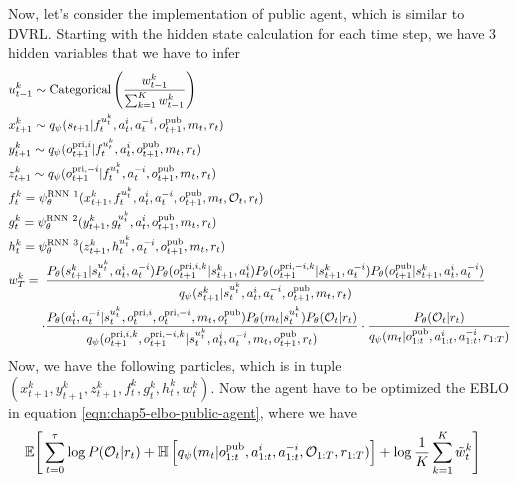 \label{sec:chap5-public-agent-implementation}
Now, let's consider the implementation of public agent, which is similar to DVRL. Starting with the hidden state calculation for each time step, we have 3 hidden variables that we have to infer
\begin{equation}
\begin{aligned}
    &u^k_{t-1} \sim \text{Categorical}\left( \frac{w^k_{t-1}}{\sum^K_{k=1}w^k_{t-1}} \right) \\
    &x^k_{t+1} \sim q_\psi(s_{t+1} | f^{u^k_t}_t, a^i_t, a^{-i}_t, o^{\operatorname{pub}}_{t+1}, m_t, r_t) \\
    &y^k_{t+1} \sim q_\psi(o^{\operatorname{pri}, i}_{t+1} | f^{u^k_t}_t, a^i_t, o^{\operatorname{pub}}_{t+1}, m_t, r_t) \\ 
    &z^k_{t+1} \sim q_\psi(o^{\operatorname{pri}, -i}_{t+1} | f^{u^k_t}_t, a^{-i}_t, o^{\operatorname{pub}}_{t+1}, m_t, r_t) \\
    &f^k_t = \psi^{\text{RNN} \ 1}_\theta (x^k_{t+1}, f^{u^k_t}_t, a^i_t, a^{-i}_t, o^{\operatorname{pub}}_{t+1}, m_t, \mathcal{O}_t, r_t) \\
    &g^k_t = \psi^{\text{RNN} \ 2}_\theta (y^k_{t+1}, g^{u^k_t}_t, a^i_t, o^{\operatorname{pub}}_{t+1}, m_t, r_t) \\
    &h^k_t = \psi^{\text{RNN} \ 3}_\theta (z^k_{t+1}, h^{u^k_t}_t, a^{-i}_t, o^{\operatorname{pub}}_{t+1}, m_t, r_t) \\
    &w^k_T = \begin{aligned}[t]
        &\frac{P_\theta(s_{t+1}^k | s_t^{u^k_t}, a_t^i, a_t^{-i})P_\theta(o^{\operatorname{pri}, i, k}_{t+1} | s_{t+1}^k, a^i_t) P_\theta(o^{\operatorname{pri}, -i, k}_{t+1} | s_{t+1}^k, a^{-i}_t) P_\theta(o^{\operatorname{pub}}_{t+1} | s_{t+1}^k, a^i_t, a^{-i}_t)}{q_\psi(s_{t+1}^k | s_t^{u^k_t}, a^i_t, a^{-i}_t, o^{\operatorname{pub}}_{t+1}, m_t, r_t)} \\
        \cdot&\frac{P_\theta(a^i_t, a^{-i}_t | s_t^{u^k_t}, o^{\operatorname{pri}, i}_t, o^{\operatorname{pri}, -i}_t, m_t, o^{\operatorname{pub}}_t) P_\theta(m_t | s_t^{u^k_t}) P_\theta(\mathcal{O}_t | r_t)}{q_\psi(o^{\operatorname{pri}, i, k}_{t+1}, o^{\operatorname{pri}, -i, k}_{t+1} | s_t^{u^k_t}, a^i_t, a^{-i}_t, m_t, o^{\operatorname{pub}}_{t+1}, r_t)} \cdot \frac{P_\theta(\mathcal{O}_t | r_t)}{q_\psi(m_t | o^{\operatorname{pub}}_{1:t}, a^{i}_{1:t}, a^{-i}_{1:t}, r_{1:T})}
    \end{aligned}
\end{aligned}
\end{equation}
Now, we have the following particles, which is in tuple $(x^k_{t+1}, y^k_{t+1}, z^k_{t+1}, f^k_t, g^k_t, h^k_t, w^k_t)$. Now the agent have to be optimized the EBLO in equation \ref{eqn:chap5-elbo-public-agent}, where we have 
\begin{equation}
\begin{aligned}
\label{eqn:chap5-elbo-public-agent}
    \mathbb{E}\Bigg[\sum^\tau_{t=0} &\log P(\mathcal{O}_t | r_t) + \mathbb{H}\left[ q_\psi(m_t | o^{\operatorname{pub}}_{1:t}, a^{i}_{1:t}, a^{-i}_{1:t}, \mathcal{O}_{1:T}, r_{1:T}) \right] + \log \frac{1}{K} \sum ^K_{k=1}\tilde{w}_t^k\Bigg]
\end{aligned}
\end{equation}
